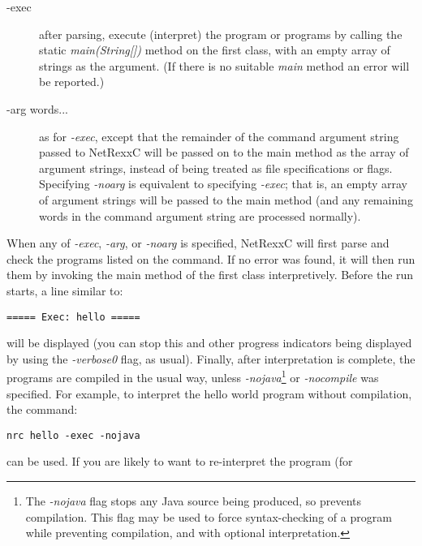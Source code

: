 \begin{description}
\item[-exec]
after parsing, execute (interpret) the program or programs by calling
the static \emph{main(String[])} method on the first class, with an
empty array of strings as the argument.  (If there is no suitable \emph{main}
method an error will be reported.)
\item[-arg words...]
as for \emph{-exec}, except that the remainder of the command argument
string passed to NetRexxC will be passed on to the main method as the
array of argument strings, instead of being treated as file
specifications or flags.  Specifying \emph{-noarg} is equivalent to
specifying \emph{-exec}; that is, an empty array of argument strings
will be passed to the main method (and any remaining words in the
command argument string are processed normally).
\end{description}
When any of \emph{-exec}, \emph{-arg}, or \emph{-noarg} is specified,
NetRexxC will first parse and check the programs listed on the command.
If no error was found, it will then run them by invoking the main method
of the first class interpretively.
\newline
Before the run starts, a line similar to:
\begin{verbatim}
===== Exec: hello =====
\end{verbatim}
will be displayed (you can stop this and other progress indicators being
displayed by using the \emph{-verbose0} flag, as usual).
\newline
{}
Finally, after interpretation is complete, the programs are compiled in
the usual way, unless \emph{-nojava}\footnote{The \emph{-nojava} flag stops any Java source being produced, so
prevents compilation.  This flag may be used to force syntax-checking of
a program while preventing compilation, and with optional
interpretation.}
or \emph{-nocompile} was specified.
\newline
For example, to interpret the hello world program without
compilation, the command:
\begin{verbatim}
nrc hello -exec -nojava
\end{verbatim}
can be used.  If you are likely to want to re-interpret the program (for
